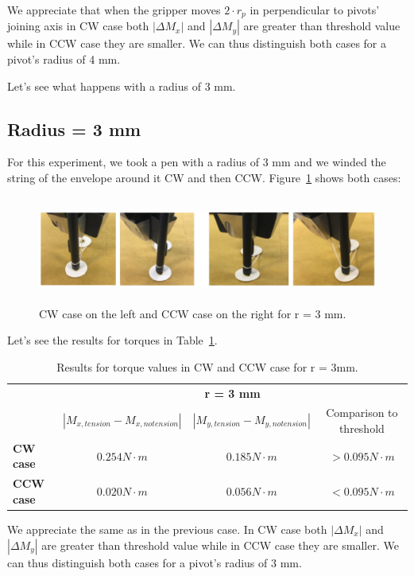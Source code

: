 We appreciate that when the gripper moves $2 \cdot r_{p}$ in perpendicular to pivots' joining axis in CW case both $|\Delta M_{x}|$ and $| \Delta M_{y}|$ are greater than threshold value while in CCW case they are smaller. We can thus distinguish both cases for a pivot's radius of 4 mm.

Let's see what happens with a radius of 3 mm.

\subsection{Radius = 3 mm}
For this experiment, we took a pen with a radius of 3 mm and we winded the string of the envelope around it CW and then CCW. Figure~\ref{fig:CWCCW2} shows both cases:
\begin{figure}[h!]
	\centering
	\includegraphics[height=35mm]{chapters/figures/experiments/exp2_CWCCW2.jpg}
	\caption{CW case on the left and CCW case on the right for r = 3 mm.}
	\label{fig:CWCCW2}
\end{figure}

Let's see the results for torques in Table~\ref{tab:3mm}.
\begin{table}[htbp]
	\centering
	\begin{tabular}{|l|c|c|c|}
		\cmidrule{2-4}    \multicolumn{1}{r|}{} & \multicolumn{3}{c|}{\textbf{r = 3 mm}} \\
		\cmidrule{2-4}    \multicolumn{1}{r|}{} & \textbf{$|M_{x, tension} - M_{x, no tension}|$} & \textbf{$|M_{y, tension} - M_{y, no tension}|$} & Comparison to threshold \\
		\cmidrule{1-4}
		\textbf{CW case} & $0.254 N \cdot m$ & $0.185 N \cdot m$ & $> 0.095 N \cdot m$ \\
		\midrule
		\textbf{CCW case} & $0.020 N \cdot m$ & $0.056 N \cdot m$ & $< 0.095 N \cdot m$ \\
		\bottomrule
	\end{tabular}%
	\caption{Results for torque values in CW and CCW case for r = 3mm.}
	\label{tab:3mm}%
\end{table}%

We appreciate the same as in the previous case. In CW case both $|\Delta M_{x}|$ and $| \Delta M_{y}|$ are greater than threshold value while in CCW case they are smaller. We can thus distinguish both cases for a pivot's radius of 3 mm.

